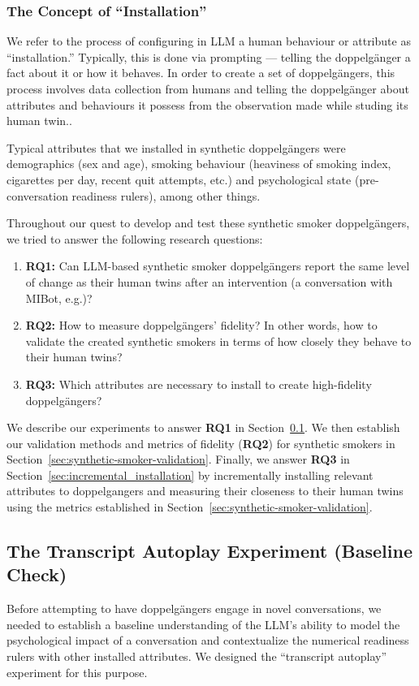 \subsubsection*{The Concept of ``Installation''}
We refer to the process of configuring in LLM a human behaviour or attribute as ``installation.'' Typically, this is done via prompting --- telling the doppelgänger a fact about it or how it behaves. In order to create a set of doppelgängers, this process involves data collection from humans and telling the doppelgänger about attributes and behaviours it possess from the observation made while studing its human twin..

Typical attributes that we installed in synthetic doppelgängers were demographics (sex and age), smoking behaviour (heaviness of smoking index, cigarettes per day, recent quit attempts, etc.) and psychological state (pre-conversation readiness rulers), among other things.


Throughout our quest to develop and test these synthetic smoker doppelgängers, we tried to answer the following research questions:

\begin{enumerate}
    \item \textbf{RQ1:} Can LLM-based synthetic smoker doppelgängers report the same level of change as their human twins after an intervention (a conversation with MIBot, e.g.)?

    \item \textbf{RQ2:} How to measure doppelgängers' fidelity? In other words, how to validate the created synthetic smokers in terms of how closely they behave to their human twins?

    \item \textbf{RQ3:} Which attributes are necessary to install to create high-fidelity doppelgängers?
\end{enumerate}



We describe our experiments to answer \textbf{RQ1} in Section~\ref{sec:transcript-autoplay}. We then establish our validation methods and metrics of fidelity (\textbf{RQ2}) for synthetic smokers in Section~\ref{sec:synthetic-smoker-validation}. Finally, we answer \textbf{RQ3} in Section~\ref{sec:incremental_installation} by incrementally installing relevant attributes to doppelgangers and measuring their closeness to their human twins using the metrics established in Section~\ref{sec:synthetic-smoker-validation}.


\subsection{The Transcript Autoplay Experiment (Baseline Check)}
\label{sec:transcript-autoplay}
Before attempting to have doppelgängers engage in novel conversations, we needed to establish a baseline understanding of the LLM's ability to model the psychological impact of a conversation and contextualize the numerical readiness rulers with other installed attributes. We designed the ``transcript autoplay'' experiment for this purpose.

